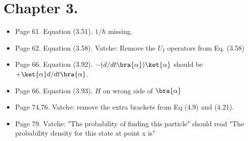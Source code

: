 \section{Chapter 3.}
\begin{itemize}
\item Page 61.  Equation (3.51).  $1/\hbar$ missing.
\item Page 62.  Equation (3.58).  Vatche: Remove the $U_I$ operators from Eq. (3.58)
\item Page 66.  Equation (3.92).  $-(d/dt \bra{\alpha}) \ket{\alpha}$ should be $+\ket{\alpha} d/dt \bra{\alpha}$.
\item Page 66.  Equation (3.93).  $H$ on wrong side of $\bra{\alpha}$ 
\item Page 74,76.  Vatche: remove the extra brackets from Eq (4.9) and (4.21).
\item Page 79.  Vatche: "The probability of finding this particle" should read "The probability density for this state at point x is"
\end{itemize}


